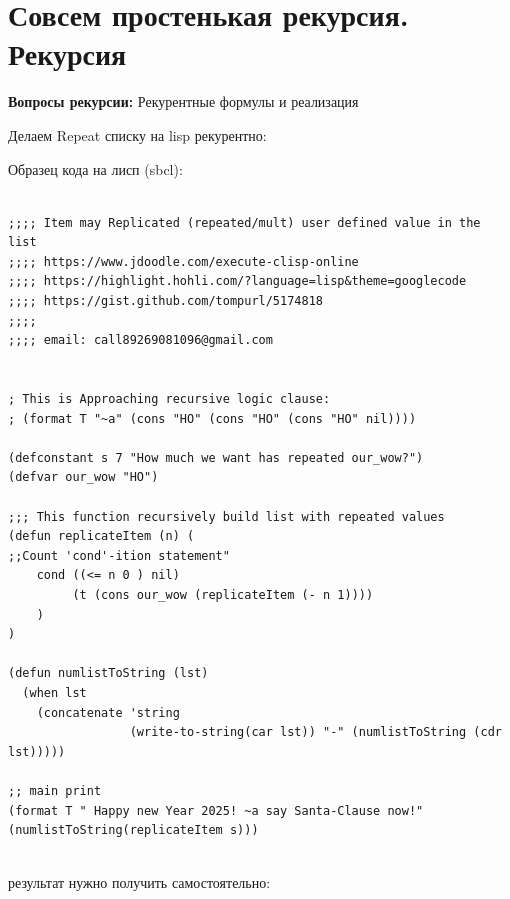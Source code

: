 \documentclass[12pt, leqno]{article}
\begin{document}
\section*{Совсем простенькая рекурсия. Рекурсия}
\begin{flushleft}
\textbf{Вопросы рекурсии:} Рекурентные формулы и реализация
\end{flushleft}

Делаем Repeat списку на lisp рекурентно:

 
\noindent Образец кода на лисп (sbcl):  
\begin{verbatim}

;;;; Item may Replicated (repeated/mult) user defined value in the list
;;;; https://www.jdoodle.com/execute-clisp-online
;;;; https://highlight.hohli.com/?language=lisp&theme=googlecode
;;;; https://gist.github.com/tompurl/5174818
;;;;
;;;; email: call89269081096@gmail.com


; This is Approaching recursive logic clause: 
; (format T "~a" (cons "HO" (cons "HO" (cons "HO" nil))))

(defconstant s 7 "How much we want has repeated our_wow?")
(defvar our_wow "HO")

;;; This function recursively build list with repeated values
(defun replicateItem (n) (
;;Count 'cond'-ition statement"                 
    cond ((<= n 0 ) nil)
         (t (cons our_wow (replicateItem (- n 1)))) 
    )
)

(defun numlistToString (lst)
  (when lst
    (concatenate 'string 
                 (write-to-string(car lst)) "-" (numlistToString (cdr lst)))))

;; main print
(format T " Happy new Year 2025! ~a say Santa-Clause now!" (numlistToString(replicateItem s)))


\end{verbatim}  

результат нужно получить самостоятельно:
    
\end{document}
